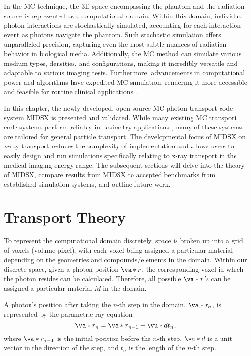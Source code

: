 \par In the MC technique, the 3D space encompassing the phantom and the radiation source is represented as a computational domain. Within this domain, individual photon interactions are stochastically simulated, accounting for each interaction event as photons navigate the phantom. Such stochastic simulation offers unparalleled precision, capturing even the most subtle nuances of radiation behavior in biological media. Additionally, the MC method can simulate various medium types, densities, and configurations, making it incredibly versatile and adaptable to various imaging tests. Furthermore, advancements in computational power and algorithms have expedited MC simulation, rendering it more accessible and feasible for routine clinical applications \cite{fernandez_bosman_validation_2021}.

\par In this chapter, the newly developed, open-source MC photon transport code system MIDSX is presented and validated. While many existing MC transport code systems perform reliably in dosimetry applications \cite{fernandez_bosman_validation_2021, geant4valid2004}, many of these systems are tailored for general particle transport. The developmental focus of MIDSX on x-ray transport reduces the complexity of implementation and allows users to easily design and run simulations specifically relating to x-ray transport in the medical imaging energy range. The subsequent sections will delve into the theory of MIDSX, compare results from MIDSX to accepted benchmarks from established simulation systems, and outline future work.

\section{Transport Theory} \label{sec:theory}
\par To represent the computational domain discretely, space is broken up into a grid of voxels (volume pixel), with each voxel being assigned a particular material depending on the geometries and compounds/elements in the domain. Within our discrete space, given a photon position $\va*{r}$, the corresponding voxel in which the photon resides can be calculated. Therefore, all possible $\va*{r}$'s can be assigned a particular material $M$ in the domain.

\par A photon's position after taking the $n$-th step in the domain, $\va*{r}_n$, is represented by the parametric ray equation:
\begin{equation} \label{eq:1}
    \va*{r}_n = \va*{r}_{n-1} + \vu*{d}t_n,
\end{equation}
where $\va*{r}_{n-1}$ is the initial position before the $n$-th step, $\vu*{d}$ is a unit vector in the direction of the step, and $t_n$ is the length of the $n$-th step.

